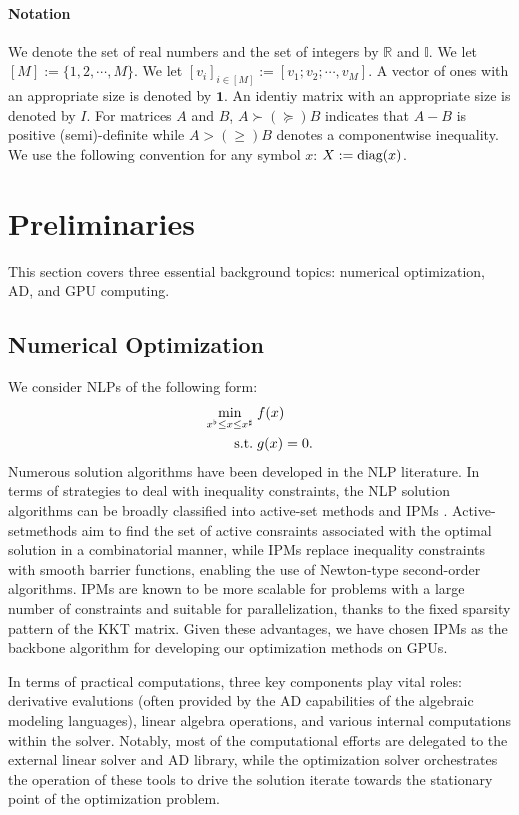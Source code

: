 \paragraph*{Notation}
We denote the set of real numbers and the set of integers by
$\mathbb{R}$ and $\mathbb{I}$. We let $[M]:=\{1,2,\cdots,M\}$. We let
$[v_i]_{i\in[M]}:=[v_1;v_2;\cdots,v_M]$.  A vector of ones with an
appropriate size is denoted by $\boldsymbol{1}$. An identiy matrix
with an appropriate size is denoted by $I$. For matrices $A$ and $B$,
$A\succ(\succeq) B$ indicates that $A-B$ is positive (semi)-definite
while $A>(\geq) B$ denotes a componentwise inequality. We use the
following convention for any symbol $x$: $X:=\mathop{\text{\normalfont diag}}(x)$.

\section{Preliminaries}\label{sec:prelim}
This section covers three essential background topics: numerical
optimization, AD, and GPU computing.

\subsection{Numerical Optimization}\label{sec:numopt}
We consider NLPs of the following form:
\begin{subequations}\label{eqn:cpt}
  \begin{align}
    \min_{x^\flat \leq x \leq x^\sharp}\;
    & f(x)\\
    \mathop{\text{\normalfont s.t.}}\;
    & g(x) =0. \label{eqn:cpt-con}
  \end{align} 
\end{subequations}
Numerous solution algorithms have been developed in the NLP
literature. In terms of strategies to deal with inequality
constraints, the NLP solution algorithms can be broadly classified
into active-set methods and IPMs \cite{nocedal2006numerical}.
Active-setmethods aim to find the set of active consraints associated
with the optimal solution in a combinatorial manner, while IPMs
replace inequality constraints with smooth barrier functions, enabling
the use of Newton-type second-order algorithms. IPMs are known to be
more scalable for problems with a large number of constraints and
suitable for parallelization, thanks to the fixed sparsity pattern of
the KKT matrix. Given these advantages, we have chosen IPMs as the
backbone algorithm for developing our optimization methods on GPUs.

In terms of practical computations, three key components play
vital roles: derivative evalutions (often provided by the AD
capabilities of the algebraic modeling languages), linear algebra
operations, and various internal computations within the
solver. Notably, most of the computational efforts are delegated to
the external linear solver and AD library, while the optimization solver
orchestrates the operation of these tools to drive the solution
iterate towards the stationary point of the optimization problem. 


